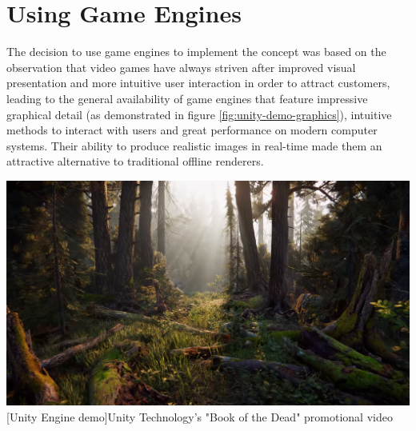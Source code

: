 \section{Using Game Engines}
The decision to use game engines to implement the concept was based on the observation that video games have always striven after improved visual presentation and more intuitive user interaction in order to attract customers, leading to the general availability of game engines that feature impressive graphical detail (as demonstrated in figure \ref{fig:unity-demo-graphics}), intuitive methods to interact with users and great performance on modern computer systems. Their ability to produce realistic images in real-time made them an attractive alternative to traditional offline renderers.
\begin{center}
\noindent\includegraphics[width=14cm]{img/ch05/UnityGraphicsDemo.png}
[Unity Engine demo]{Unity Technology's "Book of the Dead" promotional video \cite{UnityDemoRealtimeTeaser}}
\label{fig:unity-demo-graphics}
\end{center}


